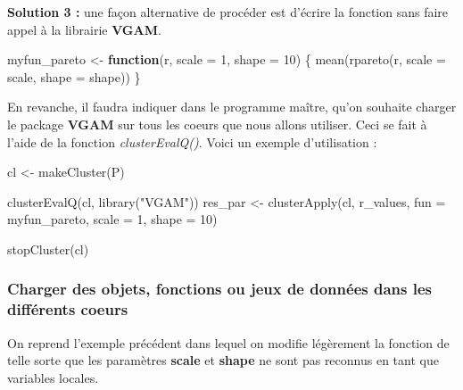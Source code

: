 \documentclass[
]{book}
\newenvironment{Shaded}{\begin{snugshade}}{\end{snugshade}}
\newcommand{\AttributeTok}[1]{\textcolor[rgb]{0.77,0.63,0.00}{#1}}
\newcommand{\ControlFlowTok}[1]{\textcolor[rgb]{0.13,0.29,0.53}{\textbf{#1}}}
\newcommand{\DecValTok}[1]{\textcolor[rgb]{0.00,0.00,0.81}{#1}}
\newcommand{\FunctionTok}[1]{\textcolor[rgb]{0.00,0.00,0.00}{#1}}
\newcommand{\NormalTok}[1]{#1}
\newcommand{\OtherTok}[1]{\textcolor[rgb]{0.56,0.35,0.01}{#1}}
\newcommand{\StringTok}[1]{\textcolor[rgb]{0.31,0.60,0.02}{#1}}
\theoremstyle{definition}
\theoremstyle{definition}
\theoremstyle{definition}
\theoremstyle{definition}
\theoremstyle{remark}
\begin{document}
\textbf{Solution 3 :} une façon alternative de procéder est d'écrire la fonction sans faire appel à la librairie \textbf{VGAM}.

\begin{Shaded}
\begin{Highlighting}[]
\NormalTok{myfun\_pareto }\OtherTok{\textless{}{-}} \ControlFlowTok{function}\NormalTok{(r, }\AttributeTok{scale =} \DecValTok{1}\NormalTok{, }\AttributeTok{shape =} \DecValTok{10}\NormalTok{) \{}
  \FunctionTok{mean}\NormalTok{(}\FunctionTok{rpareto}\NormalTok{(r, }\AttributeTok{scale =}\NormalTok{ scale, }\AttributeTok{shape =}\NormalTok{ shape))}
\NormalTok{\}}
\end{Highlighting}
\end{Shaded}

En revanche, il faudra indiquer dans le programme maître, qu'on souhaite charger le package \textbf{VGAM} sur tous les coeurs que nous allons utiliser. Ceci se fait à l'aide de la fonction \emph{clusterEvalQ()}. Voici un exemple d'utilisation :

\begin{Shaded}
\begin{Highlighting}[]
\NormalTok{cl }\OtherTok{\textless{}{-}} \FunctionTok{makeCluster}\NormalTok{(P) }

\FunctionTok{clusterEvalQ}\NormalTok{(cl, }\FunctionTok{library}\NormalTok{(}\StringTok{"VGAM"}\NormalTok{))}
\NormalTok{res\_par }\OtherTok{\textless{}{-}} \FunctionTok{clusterApply}\NormalTok{(cl, r\_values, }\AttributeTok{fun =}\NormalTok{ myfun\_pareto, }
                    \AttributeTok{scale =} \DecValTok{1}\NormalTok{, }\AttributeTok{shape =} \DecValTok{10}\NormalTok{) }

\FunctionTok{stopCluster}\NormalTok{(cl) }
\end{Highlighting}
\end{Shaded}

\hypertarget{charger-des-objets-fonctions-ou-jeux-de-donnuxe9es-dans-les-diffuxe9rents-coeurs}{%
\subsubsection{Charger des objets, fonctions ou jeux de données dans les différents coeurs}\label{charger-des-objets-fonctions-ou-jeux-de-donnuxe9es-dans-les-diffuxe9rents-coeurs}}

On reprend l'exemple précédent dans lequel on modifie légèrement la fonction de telle sorte que les paramètres \textbf{scale} et \textbf{shape} ne sont pas reconnus en tant que variables locales.
\end{document}
